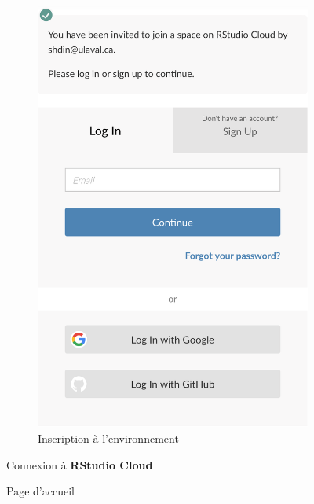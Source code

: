 \documentclass[10.5pt,a4paper]{article}
\begin{document}
\begin{figure}[H]
\begin{subfigure}{.5\textwidth}
  \includegraphics[width=1\linewidth]{_graphs/workspace.png}
  \caption{Inscription à l'environnement}
  \label{workspace}
\end{subfigure}
\caption{Connexion à \textbf{RStudio Cloud}}
\label{connexion}
\end{figure}
  
\begin{figure}[H]
  \centering
  \caption{Page d'accueil}
  \label{home}
\end{figure}
\end{document}
